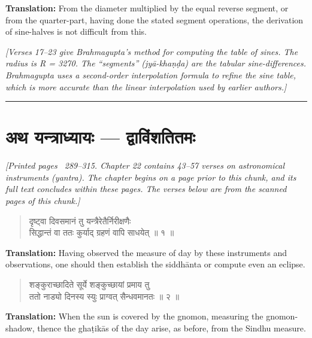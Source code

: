 \documentclass[11pt,a4paper]{article}
\newcommand{\longline}{\noindent\rule{\textwidth}{0.4pt}}
\newcommand{\cnote}[1]{\textcolor{notecolor}{\textit{#1}}}
\newcommand{\dev}[1]{{\devanagarifont #1}}
\newcommand{\dsec}[1]{\section*{\dev{#1}}}
\newenvironment{shloka}{\begin{verse}\devanagarifont\large}{\end{verse}}
\begin{document}
\textbf{Translation:}\quad
From the diameter multiplied by the equal reverse segment, or from
the quarter-part, having done the stated segment operations, the
derivation of sine-halves is not difficult from this.

\vspace{0.5cm}
\cnote{[Verses 17–23 give Brahmagupta's method for computing the table
of sines. The radius is R = 3270. The ``segments''
(\textit{jyā-khaṇḍa}) are the tabular sine-differences. Brahmagupta
uses a second-order interpolation formula to refine the sine table,
which is more accurate than the linear interpolation used by earlier
authors.]}

\longline
\newpage

\dsec{अथ यन्त्राध्यायः — द्वाविंशतितमः}

\cnote{[Printed pages ~289–315. Chapter 22 contains 43–57 verses on
astronomical instruments (\textit{yantra}). The chapter begins on a
page prior to this chunk, and its full text concludes within these
pages. The verses below are from the scanned pages of this chunk.]}

\vspace{0.5cm}

\begin{shloka}
दृष्ट्वा दिवसमानं तु यन्त्रैरेतैर्निरीक्षणैः \\
सिद्धान्तं वा ततः कुर्याद् ग्रहणं वापि साधयेत् ॥ १ ॥
\end{shloka}

\textbf{Translation:}\quad
Having observed the measure of day by these instruments and
observations, one should then establish the siddhānta or compute
even an eclipse.

\vspace{0.3cm}

\begin{shloka}
शङ्कुराच्छादिते सूर्ये शङ्कुच्छायां प्रमाय तु \\
ततो नाड्यो दिनस्य स्युः प्राग्वत् सैन्धवमानतः ॥ २ ॥
\end{shloka}

\textbf{Translation:}\quad
When the sun is covered by the gnomon, measuring the gnomon-shadow,
thence the ghaṭikās of the day arise, as before, from the Sindhu
measure.

\vspace{0.3cm}
\end{document}
